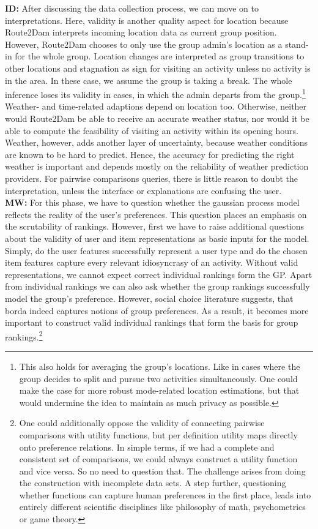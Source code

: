 \documentclass[11pt,a4paper,oneside]{article}
\begin{document}
\textbf{ID:} After discussing the data collection process, we can move on to interpretations. Here, validity is another quality aspect for location because Route2Dam interprets incoming location data as current group position. However, Route2Dam chooses to only use the group admin's location as a stand-in for the whole group. Location changes are interpreted as group transitions to other locations and stagnation as sign for visiting an activity unless no activity is in the area. In these case, we assume the group is taking a break. The whole inference loses its validity in cases, in which the admin departs from the group.\footnote{This also holds for averaging the group's locations. Like in cases where the group decides to split and pursue two activities simultaneously. One could make the case for more robust mode-related location estimations, but that would undermine the idea to maintain as much privacy as possible.} Weather- and time-related adaptions depend on location too. Otherwise, neither would Route2Dam be able to receive an accurate weather status, nor would it be able to compute the feasibility of visiting an activity within its opening hours. Weather, however, adds another layer of uncertainty, because weather conditions are known to be hard to predict. Hence, the accuracy for predicting the right weather is important and depends mostly on the reliability of weather prediction providers. For pairwise comparisons queries, there is little reason to doubt the interpretation, unless the interface or explanations are confusing the user. \\
\textbf{MW:} For this phase, we have to question whether the gaussian process model reflects the reality of the user's preferences. This question places an emphasis on the scrutability of rankings. However, first we have to raise additional questions about the validity of user and item representations as basic inputs for the model. Simply, do the user features successfully represent a user type and do the chosen item features capture every relevant idiosyncrasy of an activity. Without valid representations, we cannot expect correct individual rankings form the GP. Apart from individual rankings we can also ask whether the group rankings successfully model the group's preference. However, social choice literature suggests, that borda indeed captures notions of group preferences.\cites{masthoff_GroupModelingSelecting_2004}{weber_ComparisonPublicChoice_1978} As a result, it becomes more important to construct valid individual rankings that form the basis for group rankings.\footnote{One could additionally oppose the validity of connecting pairwise comparisons with utility functions, but per definition utility maps directly onto preference relations.\cite{fishburn_UtilityTheory_1968} In simple terms, if we had a complete and consistent set of comparisons, we could always construct a utility function and vice versa. So no need to question that. The challenge arises from doing the construction with incomplete data sets. A step further, questioning whether functions can capture human preferences in the first place, leads into entirely different scientific disciplines like philosophy of math, psychometrics or game theory.}\\  
\end{document}
